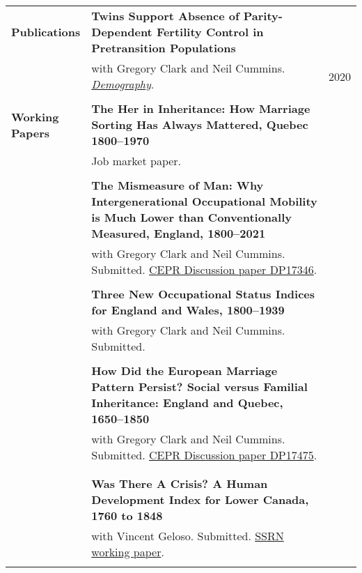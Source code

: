\documentclass[letterpaper,11pt,oneside]{article}
\begin{document}
\begin{longtable}{@{} p{0.15\linewidth} p{0.8\linewidth} p{0.05\linewidth}}
     \textbf{\large{Publications}}   & \textbf{Twins Support Absence of Parity-Dependent Fertility Control in Pretransition Populations }\\
     &  with Gregory Clark and Neil Cummins. \href{https://read.dukeupress.edu/demography/article/57/4/1571/168109/Twins-Support-the-Absence-of-Parity-Dependent}{\emph{Demography}}. & \hfill 2020\\
     \\  


     \textbf{\large{Working Papers}}  & \textbf{The Her in Inheritance: How Marriage Sorting Has Always Mattered, Quebec 1800--1970}\\ 
     &  Job market paper. &  \\
        & &
       \\

    & \textbf{The Mismeasure of Man: Why Intergenerational Occupational Mobility  is Much Lower than Conventionally Measured, England, 1800--2021}\\ 
    &  with Gregory Clark and Neil Cummins. Submitted. \href{https://hub.cepr.org/published-discussion-paper/139739}{CEPR Discussion paper DP17346}. &    \\
       & &
      \\  
      & \textbf{Three New Occupational Status Indices for England and Wales, 1800--1939}\\ 
      &  with Gregory Clark and Neil Cummins. Submitted. &   \\
     \\

 & \textbf{How Did the European Marriage Pattern Persist? Social versus Familial Inheritance: England and Quebec, 1650--1850 }\\ 
     &   with Gregory Clark and Neil Cummins. Submitted. \href{https://hub.cepr.org/published-discussion-paper/170950}{CEPR Discussion paper DP17475}. & \\
      \\

      \\
     &  \textbf{Was There A Crisis? A Human Development Index for Lower Canada, 1760 to 1848 } \\ 
      &   with Vincent Geloso. Submitted. \href{https://papers.ssrn.com/sol3/papers.cfm?abstract_id=4200516}{SSRN working paper}. &  \\
      \\ 
 

\end{longtable}
\end{document}
